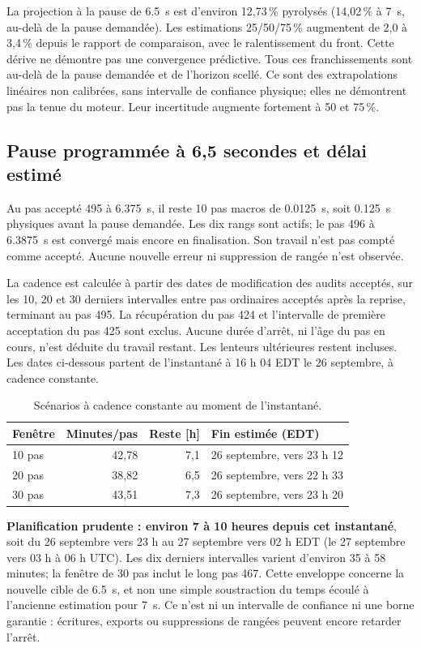 La projection à la pause de \SI{6.5}{s} est d'environ 12,73\,\% pyrolysés
(14,02\,\% à \SI{7}{s}, au-delà de la pause demandée). Les estimations
25/50/75\,\% augmentent de 2,0 à 3,4\,\% depuis le rapport de comparaison,
avec le ralentissement du front. Cette dérive ne démontre pas une convergence
prédictive.
Tous ces franchissements sont au-delà de la pause demandée et de l'horizon scellé.
Ce sont des extrapolations linéaires non calibrées, sans intervalle de confiance
physique; elles ne démontrent pas la tenue du moteur. Leur incertitude augmente
fortement à 50 et 75\,\%.

\clearpage
\subsection{Pause programmée à 6,5 secondes et délai estimé}
Au pas accepté 495 à \SI{6.375}{s}, il reste 10 pas macros de
\SI{0.0125}{s}, soit \SI{0.125}{s} physiques avant la pause demandée.
Les dix rangs sont actifs; le pas 496 à \SI{6.3875}{s} est convergé mais encore en finalisation.
Son travail n'est pas compté comme accepté. Aucune nouvelle erreur ni
suppression de rangée n'est observée.

La cadence est calculée à partir des dates de modification des audits acceptés,
sur les 10, 20 et 30 derniers intervalles entre pas ordinaires acceptés après
la reprise, terminant au pas 495. La récupération du pas 424 et l'intervalle
de première acceptation du pas 425 sont exclus. Aucune durée d'arrêt, ni l'âge
du pas en cours, n'est déduite du travail restant. Les lenteurs ultérieures
restent incluses. Les dates ci-dessous partent de l'instantané à 16 h 04 EDT
le 26 septembre, à cadence constante.
\begin{table}[H]\centering
\caption{Scénarios à cadence constante au moment de l'instantané.}
\begin{tabular}{lrrl}\toprule
Fenêtre & Minutes/pas & Reste [h] & Fin estimée (EDT)\\\midrule
10 pas & 42,78 & 7,1 & 26 septembre, vers 23 h 12\\
20 pas & 38,82 & 6,5 & 26 septembre, vers 22 h 33\\
30 pas & 43,51 & 7,3 & 26 septembre, vers 23 h 20\\\bottomrule
\end{tabular}
\end{table}
\textbf{Planification prudente : environ 7 à 10 heures depuis cet instantané},
soit du 26 septembre vers 23 h au 27 septembre vers 02 h EDT
(le 27 septembre vers 03 h à 06 h UTC). Les dix derniers intervalles varient
d'environ 35 à 58 minutes; la fenêtre de 30 pas inclut le long pas 467.
Cette enveloppe concerne la nouvelle cible de \SI{6.5}{s}, et non une simple
soustraction du temps écoulé à l'ancienne estimation pour \SI{7}{s}.
Ce n'est ni un intervalle de confiance ni une borne garantie : écritures,
exports ou suppressions de rangées peuvent encore retarder l'arrêt.

